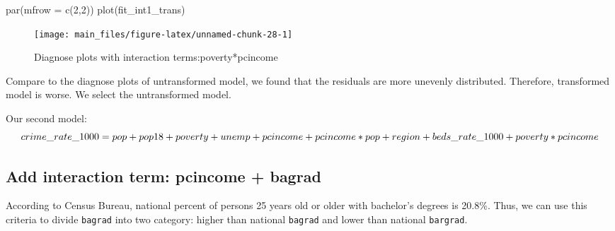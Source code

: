 \documentclass[
  11pt,
]{article}
\newenvironment{Shaded}{\begin{snugshade}}{\end{snugshade}}
\newcommand{\AttributeTok}[1]{\textcolor[rgb]{0.77,0.63,0.00}{#1}}
\newcommand{\DecValTok}[1]{\textcolor[rgb]{0.00,0.00,0.81}{#1}}
\newcommand{\FunctionTok}[1]{\textcolor[rgb]{0.00,0.00,0.00}{#1}}
\newcommand{\NormalTok}[1]{#1}
\begin{document}
\begin{Shaded}
\begin{Highlighting}[]
\FunctionTok{par}\NormalTok{(}\AttributeTok{mfrow =} \FunctionTok{c}\NormalTok{(}\DecValTok{2}\NormalTok{,}\DecValTok{2}\NormalTok{))}
\FunctionTok{plot}\NormalTok{(fit\_int1\_trans)}
\end{Highlighting}
\end{Shaded}

\begin{figure}
\texttt{[image: main\_files/figure-latex/unnamed-chunk-28-1]} \caption{\label{fig:figs}Diagnose plots with interaction terms:poverty*pcincome}\label{fig:unnamed-chunk-28}
\end{figure}

Compare to the diagnose plots of untransformed model, we found that the
residuals are more unevenly distributed. Therefore, transformed model is
worse. We select the untransformed model.

Our second model: \[crime\_rate\_1000 = pop + pop18 + 
                  poverty + unemp + pcincome + \\ pcincome*pop + region +
                  beds\_rate\_1000  +
                  poverty*pcincome\]

\hypertarget{add-interaction-term-pcincome-bagrad}{%
\subsection{Add interaction term: pcincome +
bagrad}\label{add-interaction-term-pcincome-bagrad}}

According to Census Bureau, national percent of persons 25 years old or
older with bachelor's degrees is 20.8\%. Thus, we can use this criteria
to divide \texttt{bagrad} into two category: higher than national
\texttt{bagrad} and lower than national \texttt{bargrad}.
\end{document}
